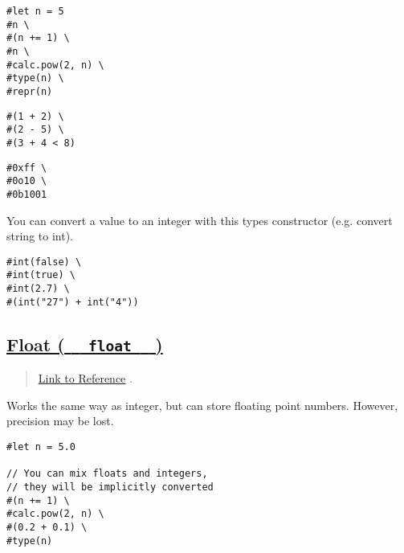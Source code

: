 \begin{verbatim}
#let n = 5
#n \
#(n += 1) \
#n \
#calc.pow(2, n) \
#type(n) \
#repr(n)
\end{verbatim}

\pandocbounded{}

\begin{verbatim}
#(1 + 2) \
#(2 - 5) \
#(3 + 4 < 8)
\end{verbatim}

\pandocbounded{}

\begin{verbatim}
#0xff \
#0o10 \
#0b1001
\end{verbatim}

\pandocbounded{}

You can convert a value to an integer with this type\textquotesingle s
constructor (e.g. convert string to int).

\begin{verbatim}
#int(false) \
#int(true) \
#int(2.7) \
#(int("27") + int("4"))
\end{verbatim}

\pandocbounded{}

\subsection{\texorpdfstring{\hyperref[float-float]{Float (
\texttt{\ }{\texttt{\ float\ }}\texttt{\ }
)}}{Float (   float   )}}\label{float-float}

\begin{quote}
\href{https://typst.app/docs/reference/foundations/float/}{Link to
Reference} .
\end{quote}

Works the same way as integer, but can store floating point numbers.
However, precision may be lost.

\begin{verbatim}
#let n = 5.0

// You can mix floats and integers, 
// they will be implicitly converted
#(n += 1) \
#calc.pow(2, n) \
#(0.2 + 0.1) \
#type(n) 
\end{verbatim}

